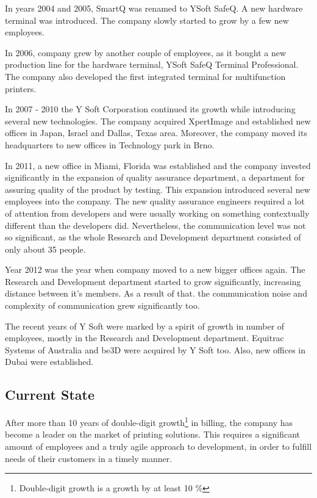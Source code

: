 \documentclass[11pt,singleside]{myfithesis2}
\begin{document}
In years 2004 and 2005, SmartQ was renamed to YSoft SafeQ. A new hardware terminal was introduced. The company slowly started to grow by a few new employees.

In 2006, company grew by another couple of employees, as it bought a new production line for the hardware terminal, YSoft SafeQ Terminal Professional. The company also developed the first integrated terminal for multifunction printers.

In 2007 - 2010 the Y Soft Corporation continued its growth while introducing several new technologies. The company acquired XpertImage and established new offices in Japan, Israel and Dallas, Texas area. Moreover, the company moved its headquarters to new offices in Technology park in Brno.

In 2011, a new office in Miami, Florida was established and the company invested significantly in the expansion of quality assurance department, a department for assuring quality of the product by testing. This expansion introduced several new employees into the company. The new quality assurance engineers required a lot of attention from developers and were usually working on something contextually different than the developers did. Nevertheless, the communication level was not so significant, as the whole Research and Development department consisted of only about 35 people.

Year 2012 was the year when company moved to a new bigger offices again. The Research and Development department started to grow significantly, increasing distance between it's members. As a result of that. the communication noise and complexity of communication grew significantly too. 

The recent years of Y Soft were marked by a spirit of growth in number of employees, mostly in the Research and Development department. Equitrac Systems of Australia and be3D were acquired by Y Soft too. Also, new offices in Dubai were established.

		\subsection{Current State}\label{currentState}
After more than 10 years of double-digit growth\footnote{Double-digit growth is a growth by at least 10 \%} in billing, the company has become a leader on the market of printing solutions. This requires a significant amount of employees and a truly agile approach to development, in order to fulfill needs of their customers in a timely manner. 
\end{document}
